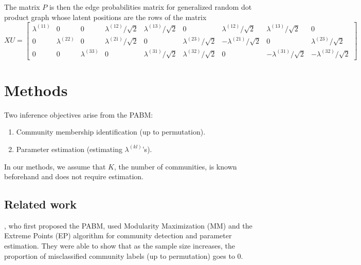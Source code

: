 \documentclass[12pt]{article}
\providecommand{\tightlist}{%
  \setlength{\itemsep}{0pt}\setlength{\parskip}{0pt}}
\begin{document}
\begin{example}
The matrix $P$ is then the edge probabilities matrix for generalized random dot product
graph whose latent positions are the rows of the matrix
$$XU = \begin{bmatrix}
  \lambda^{(11)} & 0 & 0 &
  \lambda^{(12)} / \sqrt{2} & \lambda^{(13)} / \sqrt{2} & 0 &
  \lambda^{(12)} / \sqrt{2} & \lambda^{(13)} / \sqrt{2} & 0 \\
  0 & \lambda^{(22)} & 0 &
  \lambda^{(21)} / \sqrt{2} & 0 & \lambda^{(23)} / \sqrt{2} &
  -\lambda^{(21)} / \sqrt{2} & 0 & \lambda^{(23)} / \sqrt{2} \\
  0 & 0 & \lambda^{(33)} &
  0 & \lambda^{(31)} / \sqrt{2} & \lambda^{(32)} / \sqrt{2} &
  0 & -\lambda^{(31)} / \sqrt{2} & -\lambda^{(32)} / \sqrt{2}
\end{bmatrix}$$
\end{example}

\hypertarget{methods}{%
\section{Methods}\label{methods}}

Two inference objectives arise from the PABM:

\begin{enumerate}
\def\labelenumi{\arabic{enumi}.}
\tightlist
\item
  Community membership identification (up to permutation).
\item
  Parameter estimation (estimating \(\lambda^{(kl)}\)'s).
\end{enumerate}

In our methods, we assume that \(K\), the number of communities, is
known beforehand and does not require estimation.

\hypertarget{related-work}{%
\subsection{Related work}\label{related-work}}

\citeauthor{307cbeb9b1be48299388437423d94bf1}, who first proposed the
PABM, used Modularity Maximization (MM) and the Extreme Points (EP)
algorithm \cite{le2016} for community detection and parameter
estimation. They were able to show that as the sample size increases,
the proportion of misclassified community labels (up to permutation)
goes to 0.
\end{document}
